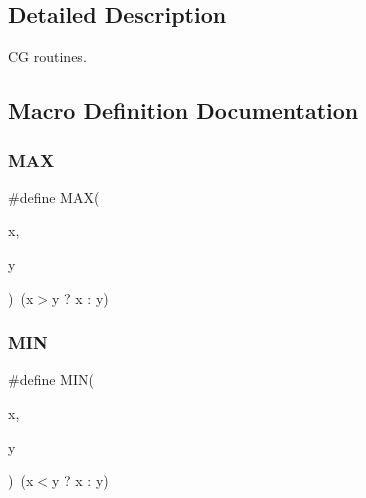 \subsection{Detailed Description}
CG routines. 



\subsection{Macro Definition Documentation}
\mbox{\label{adat-devel_2lib_2hadron_2clebsch_8cc_aacc3ee1a7f283f8ef65cea31f4436a95}} 
\subsubsection{\texorpdfstring{MAX}{MAX}}
{\footnotesize\ttfamily \#define M\+AX(\begin{DoxyParamCaption}\item[{}]{x,  }\item[{}]{y }\end{DoxyParamCaption})~(x$>$y ? x \+: y)}

\mbox{\label{adat-devel_2lib_2hadron_2clebsch_8cc_a74e75242132eaabbc1c512488a135926}} 
\subsubsection{\texorpdfstring{MIN}{MIN}}
{\footnotesize\ttfamily \#define M\+IN(\begin{DoxyParamCaption}\item[{}]{x,  }\item[{}]{y }\end{DoxyParamCaption})~(x$<$y ? x \+: y)}

